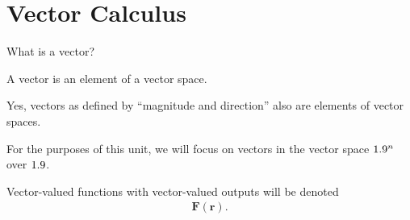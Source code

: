 \documentclass[10pt]{mypackage}
\begin{document}
\section{Vector Calculus}%
\begin{question}
  What is a vector?
\end{question}
\begin{answer}
  A vector is an element of a vector space.
\end{answer}
\begin{remark}
  Yes, vectors as defined by ``magnitude and direction'' also are elements of vector spaces.
\end{remark}
For the purposes of this unit, we will focus on vectors in the vector space $1.9^n$ over $1.9$.
\begin{notation}
  Vector-valued functions with vector-valued outputs will be denoted
  \begin{align*}
    \mathbf{F}\left(\mathbf{r}\right).
  \end{align*}
\end{notation}
\end{document}
